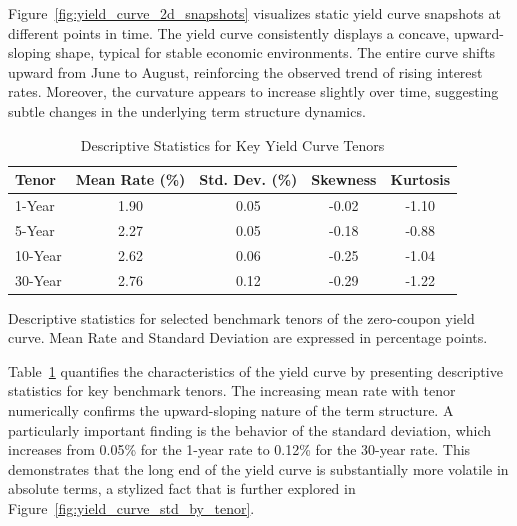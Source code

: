 Figure~\ref{fig:yield_curve_2d_snapshots} visualizes static yield curve snapshots at different points in time. The yield curve consistently displays a concave, upward-sloping shape, typical for stable economic environments. The entire curve shifts upward from June to August, reinforcing the observed trend of rising interest rates. Moreover, the curvature appears to increase slightly over time, suggesting subtle changes in the underlying term structure dynamics.

\begin{table}[H]
	\centering
	\begin{threeparttable}
		\caption{Descriptive Statistics for Key Yield Curve Tenors}
		\label{tab:yield_curve_summary}
		\begin{tabular}{lcccc}
			\toprule
			\textbf{Tenor} & \textbf{Mean Rate (\%)} & \textbf{Std. Dev. (\%)} & \textbf{Skewness} & \textbf{Kurtosis} \\
			\midrule
			1-Year         & 1.90                    & 0.05                    & -0.02             & -1.10             \\
			5-Year         & 2.27                    & 0.05                    & -0.18             & -0.88             \\
			10-Year        & 2.62                    & 0.06                    & -0.25             & -1.04             \\
			30-Year        & 2.76                    & 0.12                    & -0.29             & -1.22             \\
			\bottomrule
		\end{tabular}
		\begin{tablenotes}
			\footnotesize
			\item  Descriptive statistics for selected benchmark tenors of the zero-coupon yield curve. Mean Rate and Standard Deviation are expressed in percentage points.
		\end{tablenotes}
	\end{threeparttable}
\end{table}

Table~\ref{tab:yield_curve_summary} quantifies the characteristics of the yield curve by presenting descriptive statistics for key benchmark tenors. The increasing mean rate with tenor numerically confirms the upward-sloping nature of the term structure. A particularly important finding is the behavior of the standard deviation, which increases from 0.05\% for the 1-year rate to 0.12\% for the 30-year rate. This demonstrates that the long end of the yield curve is substantially more volatile in absolute terms, a stylized fact that is further explored in Figure~\ref{fig:yield_curve_std_by_tenor}.

